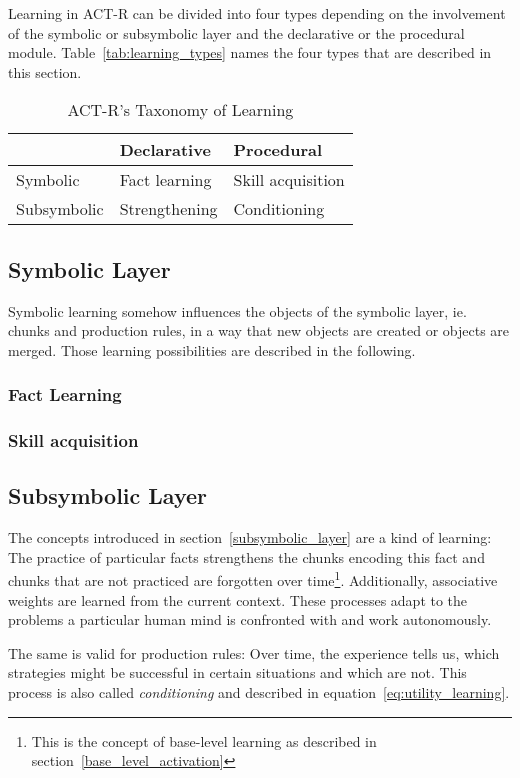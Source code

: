 Learning in ACT-R can be divided into four types depending on the involvement of the symbolic or subsymbolic layer and the declarative or the procedural module. Table~\ref{tab:learning_types} names the four types that are described in this section.

\begin{table}[hbt]
\caption{ACT-R's Taxonomy of Learning \cite[92--95]{anderson_how_2007}}
\begin{center}
\begin{tabular}{|l|ll|}
\hline
 & Declarative & Procedural\\
\hline
Symbolic & Fact learning & Skill acquisition\\
Subsymbolic & Strengthening & Conditioning\\
\hline
\end{tabular}
\end{center}
\end{table}


\subsection{Symbolic Layer}

Symbolic learning somehow influences the objects of the symbolic layer, ie. chunks and production rules, in a way that new objects are created or objects are merged. Those learning possibilities are described in the following.

\subsubsection{Fact Learning}



\subsubsection{Skill acquisition}

\subsection{Subsymbolic Layer}

The concepts introduced in section~\ref{subsymbolic_layer} are a kind of learning: The practice of particular facts strengthens the chunks encoding this fact and chunks that are not practiced are forgotten over time\footnote{This is the concept of base-level learning as described in section~\ref{base_level_activation}}. Additionally, associative weights are learned from the current context. These processes adapt to the problems a particular human mind is confronted with and work autonomously.

The same is valid for production rules: Over time, the experience tells us, which strategies might be successful in certain situations and which are not. This process is also called \emph{conditioning} and described in equation~\eqref{eq:utility_learning}.


\cite[chapter 4]{whitehill_understanding}

